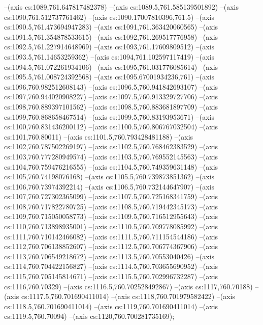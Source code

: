 --(axis cs:1089,761.647817482378)
--(axis cs:1089.5,761.585139501892)
--(axis cs:1090,761.512737761462)
--(axis cs:1090.17007810396,761.5)
--(axis cs:1090.5,761.473694947283)
--(axis cs:1091,761.363420060565)
--(axis cs:1091.5,761.354878533615)
--(axis cs:1092,761.269517776958)
--(axis cs:1092.5,761.227914648969)
--(axis cs:1093,761.17609809512)
--(axis cs:1093.5,761.14653259362)
--(axis cs:1094,761.102597117419)
--(axis cs:1094.5,761.072261934106)
--(axis cs:1095,761.031776085614)
--(axis cs:1095.5,761.008724392568)
--(axis cs:1095.67001934236,761)
--(axis cs:1096,760.982512608143)
--(axis cs:1096.5,760.941842693107)
--(axis cs:1097,760.944020908227)
--(axis cs:1097.5,760.913329727706)
--(axis cs:1098,760.889397101562)
--(axis cs:1098.5,760.883681897709)
--(axis cs:1099,760.868658467514)
--(axis cs:1099.5,760.83193953671)
--(axis cs:1100,760.831436200112)
--(axis cs:1100.5,760.806767032504)
--(axis cs:1101,760.80011)
--(axis cs:1101.5,760.793428481188)
--(axis cs:1102,760.787502269197)
--(axis cs:1102.5,760.768462383529)
--(axis cs:1103,760.777280949574)
--(axis cs:1103.5,760.769552145563)
--(axis cs:1104,760.759476216555)
--(axis cs:1104.5,760.749359631148)
--(axis cs:1105,760.74198076168)
--(axis cs:1105.5,760.739873851362)
--(axis cs:1106,760.73974392214)
--(axis cs:1106.5,760.732144647907)
--(axis cs:1107,760.727302365099)
--(axis cs:1107.5,760.725168341759)
--(axis cs:1108,760.717822780725)
--(axis cs:1108.5,760.719442345173)
--(axis cs:1109,760.715050058773)
--(axis cs:1109.5,760.716512955643)
--(axis cs:1110,760.713898935001)
--(axis cs:1110.5,760.709778085992)
--(axis cs:1111,760.710142466082)
--(axis cs:1111.5,760.711154544186)
--(axis cs:1112,760.706138852607)
--(axis cs:1112.5,760.706774367906)
--(axis cs:1113,760.706549218672)
--(axis cs:1113.5,760.70553040426)
--(axis cs:1114,760.704422156827)
--(axis cs:1114.5,760.703655690952)
--(axis cs:1115,760.705145814671)
--(axis cs:1115.5,760.702996732287)
--(axis cs:1116,760.70329)
--(axis cs:1116.5,760.702528492867)
--(axis cs:1117,760.70188)
--(axis cs:1117.5,760.701690411014)
--(axis cs:1118,760.701979582422)
--(axis cs:1118.5,760.701690411014)
--(axis cs:1119,760.701690411014)
--(axis cs:1119.5,760.70094)
--(axis cs:1120,760.700281735169);

